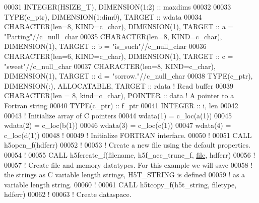 \begin{DoxyCode}
00031   \textcolor{keywordtype}{INTEGER(HSIZE\_T)}, \textcolor{keywordtype}{DIMENSION(1:2)} :: maxdims
00032   
00033   \textcolor{keywordtype}{TYPE}(c\_ptr), \textcolor{keywordtype}{DIMENSION(1:dim0)}, \textcolor{keywordtype}{TARGET} :: wdata
00034   \textcolor{keywordtype}{CHARACTER(len=8, KIND=c\_char)}, \textcolor{keywordtype}{DIMENSION(1)}, \textcolor{keywordtype}{TARGET}  :: a = \textcolor{stringliteral}{"Parting"}//c\_null\_char
00035   \textcolor{keywordtype}{CHARACTER(len=8, KIND=c\_char)}, \textcolor{keywordtype}{DIMENSION(1)}, \textcolor{keywordtype}{TARGET}  :: b = \textcolor{stringliteral}{"is\_such"}//c\_null\_char
00036   \textcolor{keywordtype}{CHARACTER(len=6, KIND=c\_char)}, \textcolor{keywordtype}{DIMENSION(1)}, \textcolor{keywordtype}{TARGET}  :: c = \textcolor{stringliteral}{"sweet"}//c\_null\_char
00037   \textcolor{keywordtype}{CHARACTER(len=8, KIND=c\_char)}, \textcolor{keywordtype}{DIMENSION(1)}, \textcolor{keywordtype}{TARGET}  :: d = \textcolor{stringliteral}{"sorrow."}//c\_null\_char
00038   \textcolor{keywordtype}{TYPE}(c\_ptr), \textcolor{keywordtype}{DIMENSION(:)}, \textcolor{keywordtype}{ALLOCATABLE}, \textcolor{keywordtype}{TARGET} :: rdata \textcolor{comment}{! Read buffer}
00039   \textcolor{keywordtype}{CHARACTER(len = 8, kind=c\_char)},  \textcolor{keywordtype}{POINTER} :: data \textcolor{comment}{! A pointer to a Fortran string}
00040   \textcolor{keywordtype}{TYPE}(c\_ptr) :: f\_ptr
00041   \textcolor{keywordtype}{INTEGER} :: i, len
00042 
00043   \textcolor{comment}{! Initialize array of C pointers}
00044   wdata(1) = c\_loc(a(1))     
00045   wdata(2) = c\_loc(b(1))     
00046   wdata(3) = c\_loc(c(1))     
00047   wdata(4) = c\_loc(d(1))     
00048   \textcolor{comment}{!}
00049   \textcolor{comment}{! Initialize FORTRAN interface.}
00050   \textcolor{comment}{!}
00051   \textcolor{keyword}{CALL }h5open\_f(hdferr)
00052   \textcolor{comment}{!}
00053   \textcolor{comment}{! Create a new file using the default properties.}
00054   \textcolor{comment}{!}
00055   \textcolor{keyword}{CALL }h5fcreate\_f(filename, h5f\_acc\_trunc\_f, \hyperlink{structfile}{file}, hdferr)
00056   \textcolor{comment}{!}
00057   \textcolor{comment}{! Create file and memory datatypes.  For this example we will save}
00058   \textcolor{comment}{! the strings as C variable length strings, H5T\_STRING is defined}
00059   \textcolor{comment}{! as a variable length string.}
00060   \textcolor{comment}{!}
00061   \textcolor{keyword}{CALL }h5tcopy\_f(h5t\_string, filetype, hdferr)
00062   \textcolor{comment}{!}
00063   \textcolor{comment}{! Create dataspace.}

\end{DoxyCode}
